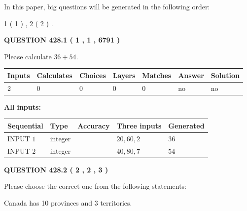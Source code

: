 \documentclass[12pt]{article}
\begin{document}
In this paper, big questions will be generated in the following order: 
   
   
   1 ( 1 )
 ,
   2 ( 2 )
 .
  
\vspace{0.2in}
  
{\textbf{\Large{QUESTION
428.1 
 ( 1 , 1 , 6791 )
}}}
  
  
 
Please calculate $ %
36 +  %
54 $.
 
 
   
   
   
   
\noindent\begin{tabular}{|l|l|l|l|l|l|l|}
 \hline
Inputs & Calculates & Choices & Layers & Matches & Answer & Solution \\ \hline
 2  & 
 0  & 
 0
  & 
 0  & 
 0  & 
  no & 
  no 
  \\ \hline
 \end{tabular}
   
   
   
   
\noindent{}
   
   
   
   
\noindent\vspace{0.1in}\hspace{-0.08in} {\textbf{\Large{All inputs: }}}
   
   
  
  
\noindent\begin{tabular}{|l|l|l|l|l|}
\hline
 Sequential & Type & Accuracy & Three inputs & Generated \\ 
\hline
 
 
  INPUT $  1 $ & integer &  & $
 20
 , 
 60
 , 
 2
 $ & $ 36 $ 
 \\  \hline  
 
 
  INPUT $  2 $ & integer &  & $
 40
 , 
 80
 , 
 7
 $ & $ 54 $ 
 \\  \hline  
 \end{tabular}
   
   
  
\vspace{0.2in}
  
{\textbf{\Large{QUESTION
428.2 
 ( 2 , 2 , 3 )
}}}
  
  
Please choose the correct one from the following statements:
 
 
Canada has 10  provinces and 3 territories.
 
\end{document}
